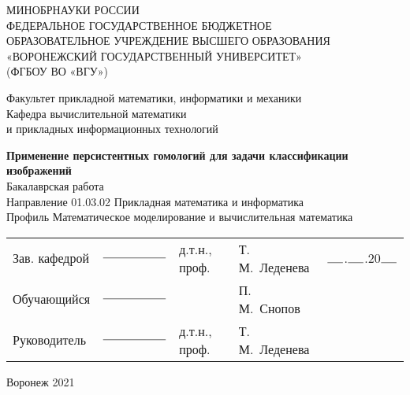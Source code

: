 \begin{titlepage} 
		\begin{center}
			\normalsize
			\begin{spacing}{1}
			МИНОБРНАУКИ РОССИИ \\
			ФЕДЕРАЛЬНОЕ  ГОСУДАРСТВЕННОЕ  БЮДЖЕТНОЕ \\
			ОБРАЗОВАТЕЛЬНОЕ  УЧРЕЖДЕНИЕ  ВЫСШЕГО  ОБРАЗОВАНИЯ \\
			«ВОРОНЕЖСКИЙ  ГОСУДАРСТВЕННЫЙ  УНИВЕРСИТЕТ» \\
			(ФГБОУ ВО «ВГУ») \\[5mm]
			\end{spacing}
			Факультет прикладной математики, информатики и механики\\[5mm]
			
			Кафедра вычислительной математики\\ и прикладных информационных технологий
			\vfill
			
			\textbf{Применение персистентных гомологий для задачи классификации изображений}\\[5mm]
			
			
			\bigskip
			Бакалаврская работа \\
			Направление 01.03.02 Прикладная математика и информатика\\
			Профиль Математическое моделирование и вычислительная математика

		\end{center}
		\vfill
		\newlength{\ML}
		\begin{tabularx}{0.5\textwidth}{l l l l l}
				Зав. кафедрой & $\rule{2cm}{0.15mm}$ & д.т.н., проф. & Т.\,М.~Леденева & $\rule{5mm}{0.15mm}$.$\rule{5mm}{0.15mm}$.20$\rule{5mm}{0.15mm}$ \\ 
				Обучающийся & $\rule{2cm}{0.15mm}$ & & П.\,М.~Снопов & \\ 
				Руководитель & $\rule{2cm}{0.15mm}$ & д.т.н., проф. &Т.\,М.~Леденева & \\
		\end{tabularx}
	
		\iffalse
		\begin{minipage}{\textwidth}
			\raggedright
			Зав. кафедрой $\rule{2cm}{0.15mm}$ д.т.н., проф. Т.\,М.~Леденева  \\
			Обучающийся $\,\rule{2cm}{0.15mm}$$\rule{2.85cm}{0.0mm}$ П.\,С.~Снопов \\
			Руководитель  $\;\rule{2cm}{0.15mm}$ д.т.н., проф. Т.\,М.~Леденева
		\end{minipage}%
		\fi
		\bigskip
		\vfill
		\begin{center}
			Воронеж 2021
		\end{center}
	\end{titlepage}